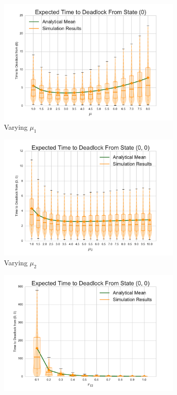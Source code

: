 \documentclass{article}
\begin{document}
\begin{figure}[!htbp]
  \begin{subfigure}[b]{0.333\textwidth}
    \includegraphics[width=\textwidth]{images/varymu_1Nms}
    \caption{Varying $\mu_1$}
    \label{fig:2Nms_mu1}
  \end{subfigure}
  \begin{subfigure}[b]{0.333\textwidth}
    \includegraphics[width=\textwidth]{images/varymu2_2Nms}
    \caption{Varying $\mu_2$}
    \label{fig:2Nms_mu2}
  \end{subfigure}
  \begin{subfigure}[b]{0.333\textwidth}
    \includegraphics[width=\textwidth]{images/varyr12_2Nms}

\end{subfigure}
\end{figure}
\end{document}
